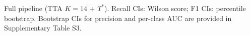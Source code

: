 Full pipeline (TTA $K{=}14$ + $T^{*}$). Recall CIs: Wilson score; F1 CIs: percentile bootstrap. Bootstrap CIs for precision and per-class AUC are provided in Supplementary Table S3.
